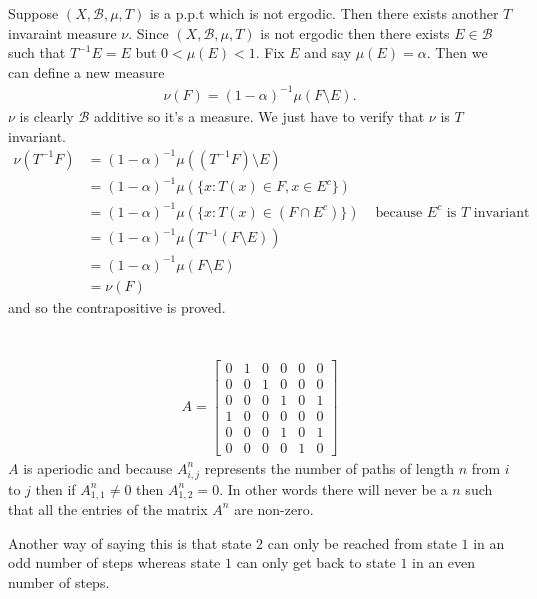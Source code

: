 \documentclass{unswmaths}
\begin{document}
Suppose $ (X, \mathcal{B}, \mu, T) $ is a p.p.t which is not ergodic. Then there exists another $ T $ invaraint measure $ \nu $. Since $ (X, \mathcal{B}, \mu, T) $ is not ergodic then there exists $ E \in \mathcal{B} $ such that
$ T^{-1} E = E $ but $ 0 < \mu(E) < 1 $. Fix $ E $ and say $ \mu(E) = \alpha $. Then we can define a new measure
\begin{align*}
    \nu(F) = (1-\alpha)^{-1} \mu(F \setminus E).
\end{align*}
$ \nu $ is clearly $ \mathcal{B} $ additive so it's a measure. We just have to verify that $ \nu $ is $ T $ invariant. 
\begin{align*}
    \nu(T^{-1} F) &= (1-\alpha)^{-1} \mu((T^{-1} F) \setminus E) \\
        &= (1-\alpha)^{-1} \mu(\{ x : T(x) \in F, x \in E^c \}) \\
        &= (1-\alpha)^{-1} \mu(\{ x : T(x) \in (F \cap E^c) \}) & \text{ because }  E^c \text{ is } T \text{ invariant } \\
        &= (1-\alpha)^{-1} \mu(T^{-1} (F \setminus E)) \\
        &= (1-\alpha)^{-1} \mu(F \setminus E) \\
        &= \nu(F)
\end{align*}
and so the contrapositive is proved.

\section{}
\begin{align*}
    A = \left[ 
        \begin{array}{cccccc}
            0 & 1 & 0 & 0 & 0 & 0 \\
            0 & 0 & 1 & 0 & 0 & 0 \\
            0 & 0 & 0 & 1 & 0 & 1 \\
            1 & 0 & 0 & 0 & 0 & 0 \\
            0 & 0 & 0 & 1 & 0 & 1 \\
            0 & 0 & 0 & 0 & 1 & 0 
        \end{array}
    \right]
\end{align*}
$ A $ is aperiodic and because $ A^n_{i,j} $ represents the number of paths of length $ n $ from $ i $ to $ j $ then
if $ A^{n}_{1,1} \neq 0 $ then $ A^n_{1,2} = 0 $. In other words there will never be a $ n $ such that all the entries of the matrix $ A^n $ are non-zero. 

Another way of saying this is that state $ 2 $ can only be reached from state $ 1 $ in an odd number of steps whereas state $ 1 $ can only get back to state $ 1 $ in an even number of steps.
\end{document}
